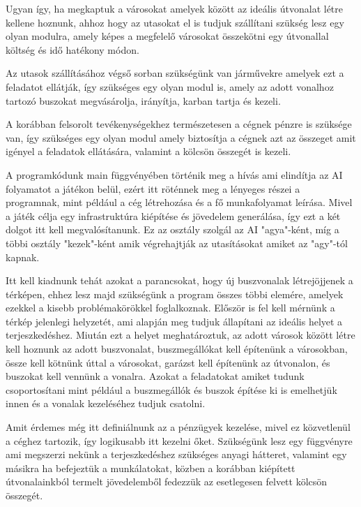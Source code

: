 Ugyan így, ha megkaptuk a városokat amelyek között az ideális útvonalat létre kellene hoznunk, ahhoz hogy az utasokat el is tudjuk szállítani szükség lesz egy olyan modulra, amely képes a megfelelő városokat összekötni egy útvonallal költség és idő hatékony módon.

Az utasok szállításához végső sorban szükségünk van járművekre amelyek ezt a feladatot ellátják, így szükséges egy olyan modul is, amely az adott vonalhoz tartozó buszokat megvásárolja, irányítja, karban tartja és kezeli.

A korábban felsorolt tevékenységekhez természetesen a cégnek pénzre is szüksége van, így szükséges egy olyan modul amely biztosítja a cégnek azt az összeget amit igényel a feladatok ellátására, valamint a kölcsön összegét is kezeli.



A programkódunk main függvényében történik meg a hívás ami elindítja az AI folyamatot a játékon belül, ezért itt röténnek meg a lényeges  részei a programnak, mint például a cég létrehozása és a fő munkafolyamat leírása. Mivel a játék célja egy infrastruktúra kiépítése és jövedelem generálása, így ezt a két dolgot itt kell megvalósítanunk. Ez az osztály szolgál az AI "agya"-ként, míg a többi osztály "kezek"-ként amik végrehajtják az utasításokat amiket az "agy"-tól kapnak.

Itt kell kiadnunk tehát azokat a parancsokat, hogy új buszvonalak létrejöjjenek a térképen, ehhez lesz majd szükségünk a program összes többi elemére, amelyek ezekkel a kisebb problémakörökkel foglalkoznak. Először is fel kell mérnünk a térkép jelenlegi helyzetét, ami alapján meg tudjuk állapítani az ideális helyet a terjeszkedéshez. Miután ezt a helyet meghatároztuk, az adott városok között létre kell hoznunk az adott buszvonalat, buszmegállókat kell építenünk a városokban, össze kell kötnünk úttal a városokat, garázst kell építenünk az útvonalon, és buszokat kell vennünk a vonalra. Azokat a feladatokat amiket tudunk csoportosítani mint például a buszmegállók és buszok építése ki is emelhetjük innen és a vonalak kezeléséhez tudjuk csatolni.

Amit érdemes még itt definiálnunk az a pénzügyek kezelése, mivel ez közvetlenül a céghez tartozik, így logikusabb itt kezelni őket. Szükségünk lesz egy függvényre ami megszerzi nekünk a terjeszkedéshez szükséges anyagi hátteret, valamint egy másikra ha befejeztük a munkálatokat, közben a korábban kiépített útvonalainkból termelt jövedelemből fedezzük az esetlegesen felvett kölcsön összegét.

